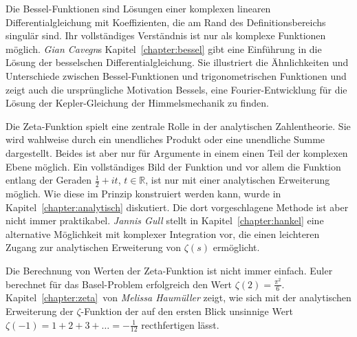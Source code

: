%
%
Die Bessel-Funktionen sind Lösungen einer komplexen linearen
Differentialgleichung mit Koeffizienten, die am Rand des
Definitionsbereichs singulär sind.
Ihr vollständiges Verständnis ist nur als komplexe Funktionen
möglich.
\emph{Gian Cavegn}s
%
%
Kapitel~\ref{chapter:bessel} gibt eine Einführung in die
Lösung der besselschen Differentialgleichung.
Sie illustriert die Ähnlichkeiten und Unterschiede zwischen
Bessel-Funktionen und trigonometrischen Funktionen und
zeigt auch die ursprüngliche Motivation Bessels, eine
%
Fourier-Entwicklung für die Lösung der Kepler-Gleichung der
%
Himmelsmechanik zu finden.

%
%
Die Zeta-Funktion spielt eine zentrale Rolle in der analytischen
Zahlentheorie.
Sie wird wahlweise durch ein unendliches Produkt oder eine unendliche
Summe dargestellt.
Beides ist aber nur für Argumente in einem einen Teil der komplexen
Ebene möglich.
Ein vollständiges Bild der Funktion und vor allem die Funktion
entlang der Geraden $\frac12+it$, $t\in\mathbb{R}$, ist nur mit einer
analytischen Erweiterung möglich.
Wie diese im Prinzip konstruiert werden kann, wurde in
Kapitel~\ref{chapter:analytisch} diskutiert.
Die dort vorgeschlagene Methode ist aber nicht immer praktikabel.
\emph{Jannis Gull}
%
%
stellt in Kapitel~\ref{chapter:hankel} eine alternative Möglichkeit
mit komplexer Integration vor, die einen leichteren Zugang zur
analytischen Erweiterung von $\zeta(s)$ ermöglicht.

%
%
Die Berechnung von Werten der Zeta-Funktion ist nicht immer einfach.
Euler berechnet für das Basel-Problem erfolgreich den Wert
$\zeta(2)=\frac{\pi^2}{6}$.
Kapitel~\ref{chapter:zeta} von
\emph{Melissa Haumüller}
%
%
zeigt, wie sich mit der analytischen Erweiterung der $\zeta$-Funktion
der auf den ersten Blick unsinnige Wert
$\zeta(-1) = 1 + 2 + 3 +\dots = -\frac{1}{12}$ recthfertigen lässt.
